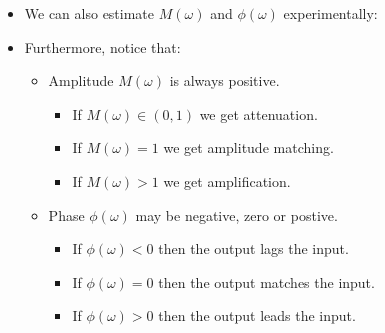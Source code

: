 \documentclass[ 10pt, xcolor = dvipsnames]{beamer}
\begin{document}
\begin{frame}[allowframebreaks]
\begin{itemize}
\end{itemize}
\framebreak

\begin{itemize}
\item We can also estimate $M(\omega)$ and $\phi(\omega)$ experimentally: 
\halfskip
\begin{figure}[htb]
\centering
\def\svgwidth{0.8\columnwidth}

\end{figure}
\end{itemize}
\framebreak

\begin{itemize}
\item Furthermore, notice that: 
\begin{itemize}
\item Amplitude $M(\omega)$ is always positive. 
\begin{itemize}
\item If $M(\omega) \in (0,1)$ we get attenuation. 
\item If $M(\omega) = 1$ we get amplitude matching. 
\item If $M(\omega) > 1$ we get amplification. 
\end{itemize}
\item Phase $\phi(\omega)$ may be negative, zero or postive. 
\begin{itemize}
\item If $\phi(\omega) < 0$ then the output lags the input. 
\item If $\phi(\omega) = 0$ then the output matches the input. 
\item If $\phi(\omega) > 0$ then the output leads the input. 
\end{itemize}
\end{itemize}
\end{itemize}

\end{frame}
\end{document}
